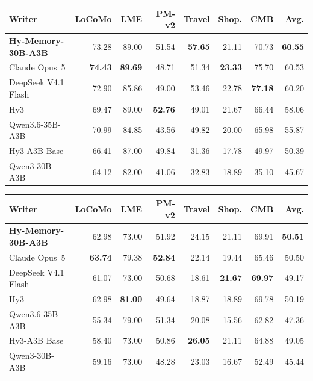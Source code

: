 \documentclass{article}
\begin{document}
\begin{minipage}{\linewidth}
\centering
\scriptsize
\setlength{\tabcolsep}{2.4pt}
\begin{tabular}{@{}lrrrrrrr@{}}
\toprule
Writer & LoCoMo & LME & PM-v2 & Travel & Shop. & CMB & Avg. \\
\midrule
\textbf{Hy-Memory-30B-A3B} & 73.28 & 89.00 & 51.54 & \textbf{57.65} & 21.11 & 70.73 & \textbf{60.55} \\
Claude Opus~5 & \textbf{74.43} & \textbf{89.69} & 48.71 & 51.34 & \textbf{23.33} & 75.70 & 60.53 \\
DeepSeek V4.1 Flash & 72.90 & 85.86 & 49.00 & 53.46 & 22.78 & \textbf{77.18} & 60.20 \\
Hy3 & 69.47 & 89.00 & \textbf{52.76} & 49.01 & 21.67 & 66.44 & 58.06 \\
Qwen3.6-35B-A3B & 70.99 & 84.85 & 43.56 & 49.82 & 20.00 & 65.98 & 55.87 \\
Hy3-A3B Base & 66.41 & 87.00 & 49.84 & 31.36 & 17.78 & 49.97 & 50.39 \\
Qwen3-30B-A3B & 64.12 & 82.00 & 41.06 & 32.83 & 18.89 & 35.10 & 45.67 \\
\bottomrule
\end{tabular}
\label{tab:detail-hymemory}
\end{minipage}
\vspace{0pt}

\begin{minipage}{\linewidth}
\centering
\scriptsize
\setlength{\tabcolsep}{2.4pt}
\begin{tabular}{@{}lrrrrrrr@{}}
\toprule
Writer & LoCoMo & LME & PM-v2 & Travel & Shop. & CMB & Avg. \\
\midrule
\textbf{Hy-Memory-30B-A3B} & 62.98 & 73.00 & 51.92 & 24.15 & 21.11 & 69.91 & \textbf{50.51} \\
Claude Opus~5 & \textbf{63.74} & 79.38 & \textbf{52.84} & 22.14 & 19.44 & 65.46 & 50.50 \\
DeepSeek V4.1 Flash & 61.07 & 73.00 & 50.68 & 18.61 & \textbf{21.67} & \textbf{69.97} & 49.17 \\
Hy3 & 62.98 & \textbf{81.00} & 49.64 & 18.87 & 18.89 & 69.78 & 50.19 \\
Qwen3.6-35B-A3B & 55.34 & 79.00 & 51.34 & 20.08 & 15.56 & 62.82 & 47.36 \\
Hy3-A3B Base & 58.40 & 73.00 & 50.86 & \textbf{26.05} & 21.11 & 64.88 & 49.05 \\
Qwen3-30B-A3B & 59.16 & 73.00 & 48.28 & 23.03 & 16.67 & 52.49 & 45.44 \\
\bottomrule
\end{tabular}
\label{tab:detail-memos}
\end{minipage}
\vspace{0pt}
\end{document}
